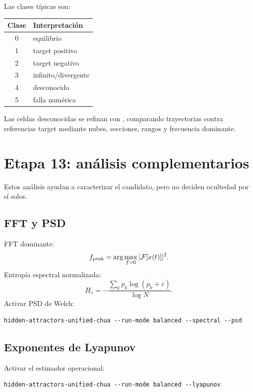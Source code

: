 \documentclass[11pt]{article}
\newcommand{\code}[1]{\path{#1}}
\begin{document}
Las clases típicas son:
\begin{center}
\begin{tabular}{cl}
\toprule
Clase & Interpretación \\
\midrule
0 & equilibrio \\
1 & target positivo \\
2 & target negativo \\
3 & infinito/divergente \\
4 & desconocido \\
5 & falla numérica \\
\bottomrule
\end{tabular}
\end{center}

Las celdas desconocidas se refinan con \code{refined\_basin}, comparando trayectorias contra referencias target mediante nubes, secciones, rangos y frecuencia dominante.

\section{Etapa 13: análisis complementarios}

Estos análisis ayudan a caracterizar el candidato, pero no deciden ocultedad por sí solos.

\subsection{FFT y PSD}

FFT dominante:
\begin{equation}
 f_{\rm peak}=\arg\max_{f>0}|\mathcal F[x(t)]|^2.
\end{equation}
Entropía espectral normalizada:
\begin{equation}
H_s=-\frac{\sum_k p_k\log(p_k+\varepsilon)}{\log N}.
\end{equation}
Activar PSD de Welch:
\begin{lstlisting}
hidden-attractors-unified-chua --run-mode balanced --spectral --psd
\end{lstlisting}

\subsection{Exponentes de Lyapunov}

Activar el estimador operacional:
\begin{lstlisting}
hidden-attractors-unified-chua --run-mode balanced --lyapunov
\end{lstlisting}
\end{document}
